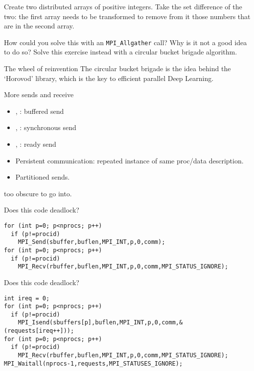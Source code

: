 \begin{exerciseframe}[setdiff]
  Create two distributed arrays of positive integers.
  Take the set difference of the two:
  the first array needs to be transformed to remove from it those numbers
  that are in the second array.

  How could you solve this with an \lstinline+MPI_Allgather+ call?
  Why is it not a good idea to do so?
  Solve this exercise instead with a circular bucket brigade algorithm.
\end{exerciseframe}

\begin{numberedframe}{The wheel of reinvention}
  The circular bucket brigade is the idea behind the `Horovod'
  library, which is the key to efficient parallel Deep Learning.
\end{numberedframe}

\begin{numberedframe}{More sends and receive}
  \begin{itemize}
  \item {}, : buffered send
  \item {}, : synchronous send
  \item {}, : ready send
  \item Persistent communication: repeated instance of same proc/data description.
  \end{itemize}
    \begin{mpifour}
      \begin{itemize}
      \item
        Partitioned sends.
      \end{itemize}
    \end{mpifour}
  too obscure to go into.
\end{numberedframe}

\begin{reviewframe}
  Does this code deadlock?
\begin{lstlisting}
for (int p=0; p<nprocs; p++)
  if (p!=procid)
    MPI_Send(sbuffer,buflen,MPI_INT,p,0,comm);
for (int p=0; p<nprocs; p++)
  if (p!=procid)
    MPI_Recv(rbuffer,buflen,MPI_INT,p,0,comm,MPI_STATUS_IGNORE);
\end{lstlisting}
\end{reviewframe}

\begin{reviewframe}
  Does this code deadlock?
\begin{lstlisting}
int ireq = 0;
for (int p=0; p<nprocs; p++)
  if (p!=procid)
    MPI_Isend(sbuffers[p],buflen,MPI_INT,p,0,comm,&(requests[ireq++]));
for (int p=0; p<nprocs; p++)
  if (p!=procid)
    MPI_Recv(rbuffer,buflen,MPI_INT,p,0,comm,MPI_STATUS_IGNORE);
MPI_Waitall(nprocs-1,requests,MPI_STATUSES_IGNORE);
\end{lstlisting}
\end{reviewframe}

